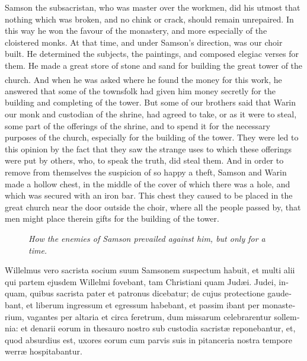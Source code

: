 \documentclass[10pt]{book}
\newcounter{engnote}
\newcommand{\engnotenum}{\textsuperscript{\arabic{engnote}\stepcounter{engnote}}}
\newcommand{\blockhead}[4][]{
\begin{figure}
\centering
\vspace{#4}
\parbox{2.75cm}{\begin{center}\footnotesize \color{BrickRed} \emph{#2}\\ #1 \end{center}}
\end{figure}
}
\begin{document}
\begin{paracol}{2}
\begin{otherlanguage}{latin}
\end{otherlanguage}

\switchcolumn

Samson the subsacristan, who was master over the workmen, did his utmost that nothing which was broken, and no chink or crack, should remain unrepaired. In this way he won the favour of the monastery, and more especially of the cloistered monks. At that time, and under Samson's direction, was our choir built. He determined the subjects, the paintings, and composed elegiac verses for them. He made a great store of stone and sand for building the great tower of the church.\engnotenum{} And when he was asked where he found the money for this work, he answered that some of the townsfolk had given him money secretly for the building and completing of the tower. But some of our brothers said that Warin our monk and custodian of the shrine, had agreed to take, or as it were to steal, some part of the offerings of the shrine, and to spend it for the necessary purposes of the church, especially for the building of the tower. They were led to this opinion by the fact that they saw the strange uses to which these offerings were put by others, who, to speak the truth, did steal them. And in order to remove from themselves the suspicion of so happy a theft, Samson and Warin made a hollow chest, in the middle of the cover of which there was a hole, and which was secured with an iron bar. This chest they caused to be placed in the great church near the door outside the choir, where all the people passed by, that men might place therein gifts for the building of the tower.

\switchcolumn*

\begin{otherlanguage}{latin}
\blockhead{How the enemies of Samson prevailed against him, but only for a time.}{4}{-0.45cm}
Willelmus vero sacrista socium suum Samsonem suspectum habuit, et multi alii qui partem ejusdem Willelmi fovebant, tam Christiani quam Jud\ae{}i. Judei, inquam, quibus sacrista pater et patronus dicebatur; de cujus protectione gaudebant, et liberum ingressum et egressum habebant, et passim ibant per monasterium, vagantes per altaria et circa feretrum, dum missarum celebrarentur sollemnia: et denarii eorum in thesauro nostro sub custodia sacrist\ae{} reponebantur, et, quod absurdius est, uxores eorum cum parvis suis in pitanceria nostra tempore werr\ae{} hospitabantur.

\end{otherlanguage}


\end{paracol}
\end{document}
